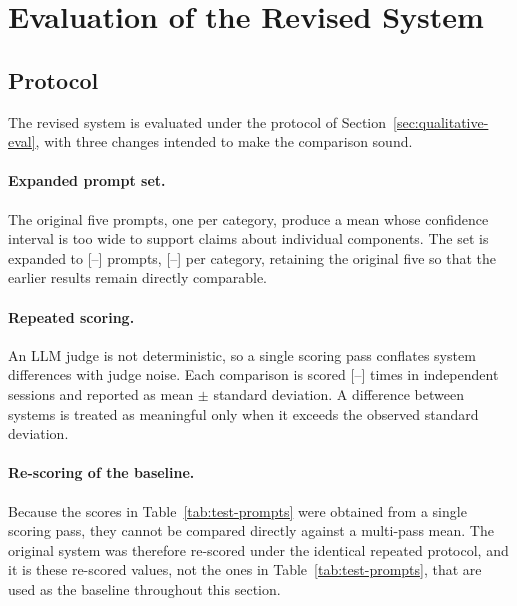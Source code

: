 %
%

\section{Evaluation of the Revised System}
\label{sec:post-eval}

\subsection{Protocol}
\label{sec:post-eval-protocol}

The revised system is evaluated under the protocol of
Section~\ref{sec:qualitative-eval}, with three changes intended to make the
comparison sound.

\paragraph{Expanded prompt set.}
The original five prompts, one per category, produce a mean whose confidence
interval is too wide to support claims about individual components. The set is
expanded to [--] prompts, [--] per category, retaining the original five so that
the earlier results remain directly comparable.

\paragraph{Repeated scoring.}
An LLM judge is not deterministic, so a single scoring pass conflates system
differences with judge noise. Each comparison is scored [--] times in
independent sessions and reported as mean $\pm$ standard deviation. A difference
between systems is treated as meaningful only when it exceeds the observed
standard deviation.

\paragraph{Re-scoring of the baseline.}
Because the scores in Table~\ref{tab:test-prompts} were obtained from a single
scoring pass, they cannot be compared directly against a multi-pass mean. The
original system was therefore re-scored under the identical repeated protocol,
and it is these re-scored values, not the ones in
Table~\ref{tab:test-prompts}, that are used as the baseline throughout this
section.

